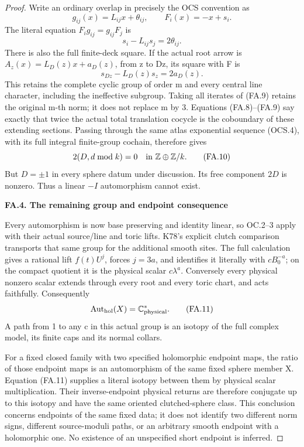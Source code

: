 \begin{proof}
Write an ordinary overlap in precisely the OCS convention as
\[
                g_{ij}(x)=L_{ij}x+\theta_{ij},
                         \qquad F_i(x)=-x+s_i.
\]
The literal equation \(F_i g_{ij}=g_{ij}F_j\) is
\[
                       s_i-L_{ij}s_j=2\theta_{ij}.        \tag{FA.8}
\]
There is also the full finite-deck square. If the actual root arrow is
\(A_z(x)=L_D(z)x+a_D(z)\), from z to Dz, its square with F is
\[
                  s_{Dz}-L_D(z)s_z=2a_D(z).              \tag{FA.9}
\]
This retains the complete cyclic group of order m and every central line
character, including the ineffective subgroup. Taking all iterates of
(FA.9) retains the original m-th norm; it does not replace m by 3.
Equations (FA.8)--(FA.9) say exactly that twice the actual total translation
cocycle is the coboundary of these extending sections. Passing through
the same atlas exponential sequence (OCS.4), with its full integral
finite-group cochain, therefore gives
\[
                2(D,d\bmod k)=0
                  \quad\hbox{in }\mathbb Z\oplus\mathbb Z/k.     \tag{FA.10}
\]
But \(D=\pm1\) in every sphere datum under discussion. Its free component
\(2D\) is nonzero. Thus a linear \(-I\) automorphism cannot exist.

\par

\medskip\noindent\textbf{FA.4. The remaining group and endpoint consequence}

\par\nobreak

Every automorphism is now base preserving and identity linear, so OC.2--3
apply with their actual source/line and toric lifts. K78's explicit
clutch comparison transports that same group for the additional smooth
sites. The full calculation gives a rational lift \(f(t)U^j\), forces \(j=3a\),
and identifies it literally with \(cB_0^{-a}\); on the compact quotient it
is the physical scalar \(c\lambda^a\). Conversely every physical nonzero
scalar extends through every root and every toric chart, and acts
faithfully. Consequently
\[
                      \operatorname{Aut}_{\rm hol}(X)
                                =\mathbb C^*_{\rm physical}.     \tag{FA.11}
\]
A path from 1 to any c in this actual group is an isotopy of the full
complex model, its finite caps and its normal collars.

For a fixed closed family with two specified holomorphic endpoint maps,
the ratio of those endpoint maps is an automorphism of the same fixed
sphere member X. Equation (FA.11) supplies a literal isotopy between
them by physical scalar multiplication. Their inverse-endpoint physical
returns are therefore conjugate up to this isotopy and have the same
oriented clutched-sphere class. This conclusion concerns endpoints of the
same fixed data; it does not identify two different norm signs, different
source-moduli paths, or an arbitrary smooth endpoint with a holomorphic
one. No existence of an unspecified short endpoint is inferred.


\end{proof}
